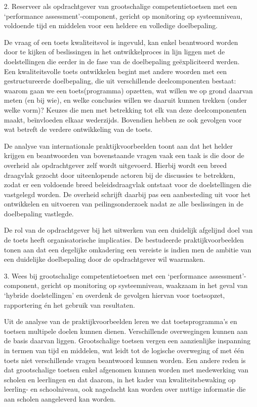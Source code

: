 \documentclass[
  letterpaper,
]{report}
\begin{document}
{ 2. Reserveer als opdrachtgever van grootschalige competentietoetsen
met een `performance assessment'-component, gericht op monitoring op
systeemniveau, voldoende tijd en middelen voor een heldere en volledige
doelbepaling. }

De vraag of een toets kwaliteitsvol is ingevuld, kan enkel beantwoord
worden door te kijken of beslissingen in het ontwikkelproces in lijn
liggen met de doelstellingen die eerder in de fase van de doelbepaling
geëxpliciteerd werden. Een kwaliteitsvolle toets ontwikkelen begint met
andere woorden met een gestructureerde doelbepaling, die uit
verschillende deelcomponenten bestaat: waarom gaan we een
toets(programma) opzetten, wat willen we op grond daarvan meten (en bij
wie), en welke conclusies willen we daaruit kunnen trekken (onder welke
vorm)? Keuzes die men met betrekking tot elk van deze deelcomponenten
maakt, beïnvloeden elkaar wederzijds. Bovendien hebben ze ook gevolgen
voor wat betreft de verdere ontwikkeling van de toets.

De analyse van internationale praktijkvoorbeelden toont aan dat het
helder krijgen en beantwoorden van bovenstaande vragen vaak een taak is
die door de overheid als opdrachtgever zelf wordt uitgevoerd. Hierbij
wordt een breed draagvlak gezocht door uiteenlopende actoren bij de
discussies te betrekken, zodat er een voldoende breed beleidsdraagvlak
ontstaat voor de doelstellingen die vastgelegd worden. De overheid
schrijft daarbij pas een aanbesteding uit voor het ontwikkelen en
uitvoeren van peilingsonderzoek nadat ze alle beslissingen in de
doelbepaling vastlegde.

De rol van de opdrachtgever bij het uitwerken van een duidelijk
afgelijnd doel van de toets heeft organisatorische implicaties. De
bestudeerde praktijkvoorbeelden tonen aan dat een degelijke omkadering
een vereiste is indien men de ambitie van een duidelijke doelbepaling
door de opdrachtgever wil waarmaken.

{ 3. Wees bij grootschalige competentietoetsen met een `performance
assessment'-component, gericht op monitoring op systeemniveau, waakzaam
in het geval van `hybride doelstellingen' en overdenk de gevolgen
hiervan voor toetsopzet, rapportering én het gebruik van resultaten. }

Uit de analyse van de praktijkvoorbeelden leren we dat toetsprogramma's
en toetsen multipele doelen kunnen dienen. Verschillende overwegingen
kunnen aan de basis daarvan liggen. Grootschalige toetsen vergen een
aanzienlijke inspanning in termen van tijd en middelen, wat leidt tot de
logische overweging of met één toets niet verschillende vragen
beantwoord kunnen worden. Een andere reden is dat grootschalige toetsen
enkel afgenomen kunnen worden met medewerking van scholen en leerlingen
en dat daarom, in het kader van kwaliteitsbewaking op leerling- en
schoolniveau, ook nagedacht kan worden over nuttige informatie die aan
scholen aangeleverd kan worden.
\end{document}
